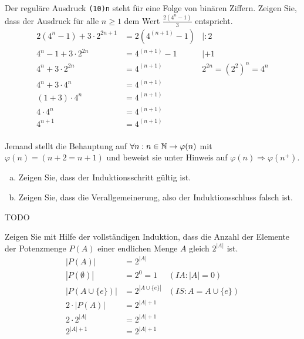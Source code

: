 \begin{card}
  Der reguläre Ausdruck \texttt{(10){n}} steht für eine Folge von binären Ziffern. Zeigen Sie, dass der Ausdruck für alle
  $n \geq 1$ dem Wert $\frac{2(4^n - 1)}{3}$ entspricht.
  \hr
  \begin{align*}
    2(4^{n} - 1) + 3 \cdot 2^{2n+1} &= 2(4^{(n+1)} - 1) & |:2 \\
    4^{n} - 1 + 3 \cdot 2^{2n} &= 4^{(n+1)} - 1 & |+1 \\
    4^{n} + 3 \cdot 2^{2n} &= 4^{(n+1)} & 2^{2n} = \left(2^2 \right)^n = 4^n \\
    4^{n} + 3 \cdot 4^n &= 4^{(n+1)} & \\
    (1+3) \cdot 4^{n} &= 4^{(n+1)} & \\
    4 \cdot 4^{n} &= 4^{(n+1)} & \\
    4^{n+1} &= 4^{(n+1)} & \\
  \end{align*}
\end{card}

\begin{card}
  Jemand stellt die Behauptung auf $\forall n : n \in \mathbb{N} \rightarrow \varphi(n)$ mit $\varphi(n) = (n+2 = n+1)$ und beweist sie unter Hinweis auf $\varphi(n) \Rightarrow \varphi(n^+)$.
  \begin{enumerate}[a)]
    \item Zeigen Sie, dass der Induktionsschritt gültig ist.
    \item Zeigen Sie, dass die Verallgemeinerung, also der Induktionsschluss falsch ist.
  \end{enumerate}
  \hr
  TODO
\end{card}

\begin{card}
  Zeigen Sie mit Hilfe der vollständigen Induktion, dass die Anzahl der Elemente der Potenzmenge $P(A)$ einer endlichen
  Menge $A$ gleich $2^{|A|}$ ist.
  \hr
  \begin{align*}
    |P(A)| &= 2^{|A|} & \\
    |P(\emptyset)| &= 2^0 = 1 & (IA: |A| = 0) \\
    |P(A \cup \{e\})| &= 2^{|A \cup \{e\}|} & (IS: A = A \cup \{e\}) \\
    2 \cdot |P(A)| &= 2^{|A|+1} & \\
    2 \cdot 2^{|A|} &= 2^{|A|+1} & \\
    2^{|A|+1} &= 2^{|A|+1} & \\
  \end{align*}
\end{card}

